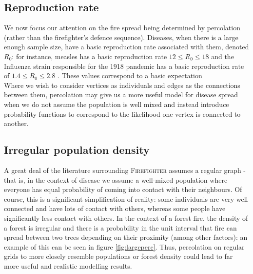 \documentclass[11pt]{amsart}
\begin{document}
\subsection{Reproduction rate}
We now focus our attention on the fire spread being determined by percolation (rather than the firefighter's defence sequence). Diseases, when there is a large enough sample size, have a basic reproduction rate associated with them, denoted $R_0$: for instance, measles has a basic reproduction rate $12\leq R_0 \leq 18$ \cite{fiona17} and the Influenza strain responsible for the 1918 pandemic has a basic reproduction rate of $1.4 \leq R_0 \leq 2.8$ \cite{ferguson06}. These values correspond to a basic expectation \\

Where we wish to consider vertices as individuals and edges as the connections between them, percolation may give us a more useful model for disease spread when we do not assume the population is well mixed and instead introduce probability functions to correspond to the likelihood one vertex is connected to another.\\

\subsection{Irregular population density}
A great deal of the literature surrounding {\scshape Firefighter} assumes a regular graph - that is, in the context of disease we assume a well-mixed population where everyone has equal probability of coming into contact with their neighbours. Of course, this is a significant simplification of reality: some individuals are very well connected and have lots of contact with others, whereas some people have significantly less contact with others. In the context of a forest fire, the density of a forest is irregular and there is a probability in the unit interval that fire can spread between two trees depending on their proximity (among other factors): an example of this can be seen in figure \ref{fig:largeperc}. Thus, percolation on regular grids to more closely resemble populations or forest density could lead to far more useful and realistic modelling results.\\
\end{document}
